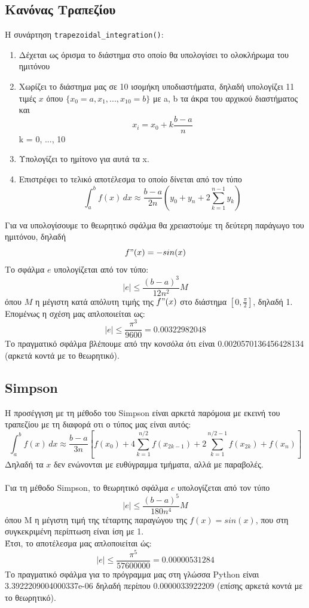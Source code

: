 \documentclass{article}
\begin{document}
\subsection{Κανόνας Τραπεζίου}
Η συνάρτηση \texttt{trapezoidal\_integration()}:
\begin{enumerate}
    \item Δέχεται ως όρισμα το διάστημα στο οποίο θα υπολογίσει το ολοκλήρωμα του ημιτόνου
    \item Χωρίζει το διάστημα μας σε 10 ισομήκη υποδιαστήματα, δηλαδή υπολογίζει 11 τιμές \(x\) όπου $\{x_0=a, x_1, ..., x_{10}=b\}$ με a, b τα άκρα του αρχικού διαστήματος και
    \[
    x_i = x_0 + k\frac{b - a}{n}
    \]
    k = 0, ..., 10
    \item Υπολογίζει το ημίτονο για αυτά τα x.
    \item Επιστρέφει το τελικό αποτέλεσμα το οποίο δίνεται από τον τύπο 
\[
\int_{a}^{b} f(x) \, dx \approx \frac{b - a}{2n} \left( y_0 + y_n + 2 \sum_{k=1}^{n-1} y_k \right)
\]
\end{enumerate}
Για να υπολογίσουμε το θεωρητικό σφάλμα θα χρειαστούμε τη δεύτερη παράγωγο του ημιτόνου, δηλαδή 
\[
f"(x) = -sin(x)
\]
Το σφάλμα \(e\) υπολογίζεται από τον τύπο:
\[
|e| \leq \frac{(b - a)^3}{
12n^2} M
\]
όπου \(M\) η μέγιστη κατά απόλυτη τιμής της $f"(x)$ στο διάστημα $[0, \frac{π}{2}]$, δηλαδή 1.
Επομένως η σχέση μας απλοποιείται ως:
\[
|e| \leq \frac{π^3}{9600} = 0.00322982048
\]
Το πραγματικό σφάλμα βλέπουμε από την κονσόλα ότι είναι 0.0020570136456428134 (αρκετά κοντά με το θεωρητικό).

\subsection{Simpson}
Η προσέγγιση με τη μέθοδο του Simpson είναι αρκετά παρόμοια με εκεινή του τραπεζίου με τη διαφορά οτι ο τύπος μας είναι αυτός:
\[
\int_{a}^{b} f(x) \, dx \approx \frac{b - a}{3n} \left[ f(x_0) + 4 \sum_{k=1}^{n/2} f(x_{2k-1}) + 2 \sum_{k=1}^{n/2-1} f(x_{2k}) + f(x_n) \right]
\]
Δηλαδή τα \(x\) δεν ενώνονται με ευθύγραμμα τμήματα, αλλά με παραβολές.\\\\
Για τη μέθοδο Simpson, το θεωρητικό σφάλμα \(e\) υπολογίζεται από τον τύπο
\[
|e| \leq \frac{(b-a)^5}{180n^4}M
\]
όπου M η μέγιστη τιμή της τέταρτης παραγώγου της $f(x) = sin(x)$, που στη συγκεκριμένη περίπτωση είναι ίση με 1.\\
Έτσι, το αποτέλεσμα μας απλοποιείται ώς:
\[
|e| \leq \frac{π^5}{57600000} = 0.00000531284
\]
Το πραγματικό σφάλμα για το πρόγραμμα μας στη γλώσσα Python είναι 3.3922209004000337e-06 δηλαδή περίπου 0.0000033922209 (επίσης αρκετά κοντά με το θεωρητικό).
\end{document}
